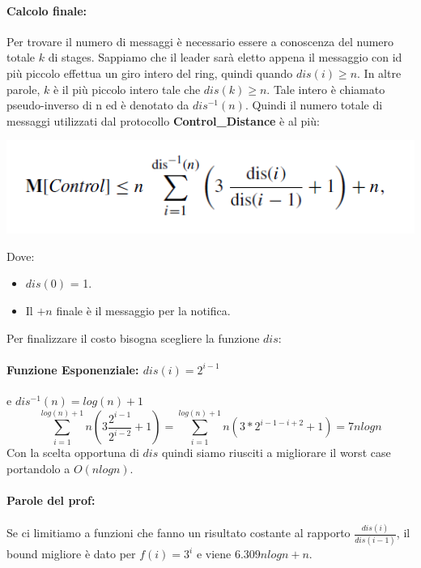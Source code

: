 \paragraph{Calcolo finale:}
Per trovare il numero di messaggi è necessario essere a conoscenza del numero
totale $k$ di stages. Sappiamo che il leader sarà eletto appena il messaggio con
id più piccolo effettua un giro intero del ring, quindi quando $dis(i) \geq n$.
In altre parole, $k$ è il più piccolo intero tale che $dis(k) \geq n$. Tale
intero è chiamato pseudo-inverso di n ed è denotato da $dis^{-1}(n)$. Quindi il
numero totale di messaggi utilizzati dal protocollo \textbf{Control\_Distance} è
al più:
\begin{center}
    \includegraphics[scale=0.6]{aa/dd.png}
\end{center}
Dove:
\begin{itemize}
    \item $dis(0)$ = 1.
    \item Il $+ n$ finale è il messaggio per la notifica.
\end{itemize}

Per finalizzare il costo bisogna scegliere la funzione $dis$:\\

\paragraph{Funzione Esponenziale: $dis(i) = 2^{i-1}$} e $dis^{-1}(n) =log(n) + 1$
$$\sum_{i=1}^{log(n) + 1 }n(3\frac{2^{i-1}}{2^{i-2}} + 1) = \sum_{i=1}^{log(n) +
        1 }n(3 * 2^{i-1-i+2}+1) =  7nlogn$$ Con la scelta opportuna di $dis$ quindi
siamo riusciti a migliorare il worst case portandolo a $O(nlogn)$.\\

\paragraph{Parole del prof:} Se ci limitiamo a funzioni che fanno un risultato
costante al rapporto $\frac{dis(i)}{dis(i-1)}$, il bound migliore è dato per
$f(i) = 3^i$ e viene $6.309 n log n + n$.

